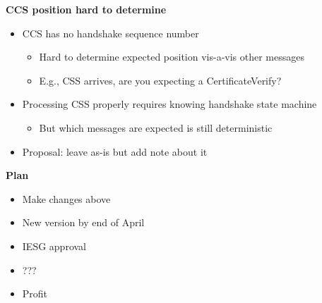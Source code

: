 \documentclass[helvetica]{seminar}
\newcommand{\heading}[1]{%
  \begin{center} 
    \large\bf 
    #1 
  \end{center} 
  \vspace{.4 in}}
\begin{document}
\begin{slide}
\heading{CCS position hard to determine}

\begin{itemize}
\item CCS has no handshake sequence number
  \begin{itemize}
  \item Hard to determine expected position vis-a-vis other messages
  \item E.g., CSS arrives, are you expecting a CertificateVerify?
  \end{itemize}

\item Processing CSS properly requires knowing handshake state machine
  \begin{itemize}
  \item But which messages are expected is still deterministic 
  \end{itemize}
\item Proposal: leave as-is but add note about it
\end{itemize}
\end{slide}


\begin{slide}
\heading{Plan}

\begin{itemize}
\item Make changes above
\item New version by end of April
\item IESG approval
\item ???
\item Profit
\end{itemize}

\end{slide}

        












\end{document}
